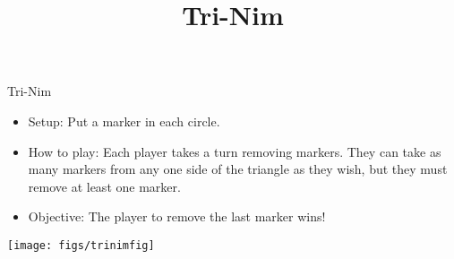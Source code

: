 \documentclass[12pt]{report}
\title{Tri-Nim}
\begin{document}
\thispagestyle{empty}

\begin{center}
  \Huge{Tri-Nim}
\end{center}

\begin{itemize}
\item Setup: Put a marker in each circle.
\item How to play: Each player takes a turn removing markers.  They
  can take as many markers from any one side of the triangle as they
  wish, but they must remove at least one marker.
\item Objective: The player to remove the last marker wins!
\end{itemize}
  
\begin{center}
  \texttt{[image: figs/trinimfig]}
\end{center}
\end{document}
